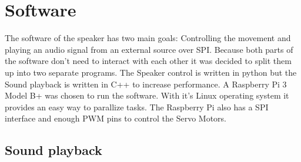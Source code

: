 \chapter{Software}

The software of the speaker has two main goals: Controlling the movement and playing an audio signal from an external source over SPI. Because both parts of the software don't need to interact with each other it was decided to split them up into two separate programs. The Speaker control is written in python but the Sound playback is written in C++ to increase performance.\p
%
A Raspberry Pi 3 Model B+ was chosen to run the software. With it's Linux operating system it provides an easy way to parallize tasks. The Raspberry Pi also has a SPI interface and enough PWM pins to control the Servo Motors.\cite{van_loo_bcm2836_2014}

\section{Sound playback}

